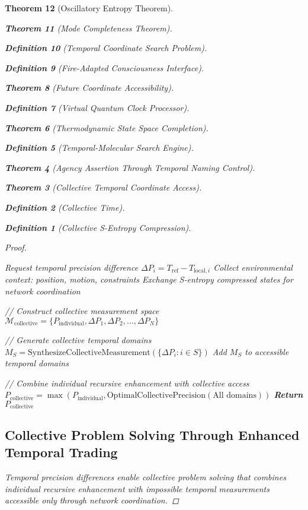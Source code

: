 \documentclass[12pt,a4paper]{article}
\newtheorem{theorem}{Theorem}[section]
\newtheorem{definition}[theorem]{Definition}
\begin{document}
\begin{theorem}[Oscillatory Entropy Theorem]
\begin{theorem}[Mode Completeness Theorem]
\begin{enumerate}
\begin{definition}[Temporal Coordinate Search Problem]
\begin{algorithm}
\begin{definition}[Fire-Adapted Consciousness Interface]
\begin{theorem}[Future Coordinate Accessibility]
\begin{definition}[Virtual Quantum Clock Processor]
\begin{itemize}
\begin{itemize}
\begin{theorem}[Thermodynamic State Space Completion]
\begin{definition}[Temporal-Molecular Search Engine]
\begin{theorem}[Agency Assertion Through Temporal Naming Control]
\begin{remark}
\begin{theorem}[Collective Temporal Coordinate Access]
\begin{definition}[Collective Time]
\begin{definition}[Collective S-Entropy Compression]
\begin{proof}
\begin{algorithm}
\begin{algorithmic}
    \State Request temporal precision difference $\Delta P_i = T_{\text{ref}} - T_{\text{local},i}$
    \State Collect environmental context: position, motion, constraints
    \State Exchange S-entropy compressed states for network coordination
\EndFor

\State // Construct collective measurement space
\State $\mathcal{M}_{\text{collective}} = \{P_{\text{individual}}, \Delta P_1, \Delta P_2, \ldots, \Delta P_N\}$

\State // Generate collective temporal domains
        \State $M_S = \text{SynthesizeCollectiveMeasurement}(\{\Delta P_i : i \in S\})$
        \State Add $M_S$ to accessible temporal domains
    \EndFor
\EndFor

\State // Combine individual recursive enhancement with collective access
\State $P_{\text{collective}} = \max(P_{\text{individual}}, \text{OptimalCollectivePrecision}(\text{All domains}))$
\State \textbf{Return} $P_{\text{collective}}$
\end{algorithmic}
\end{algorithm}

\subsection{Collective Problem Solving Through Enhanced Temporal Trading}

Temporal precision differences enable collective problem solving that combines individual recursive enhancement with impossible temporal measurements accessible only through network coordination.


\end{proof}
\end{definition}
\end{definition}
\end{theorem}
\end{remark}
\end{theorem}
\end{definition}
\end{theorem}
\end{itemize}
\end{itemize}
\end{definition}
\end{theorem}
\end{definition}
\end{algorithm}
\end{definition}
\end{enumerate}
\end{theorem}
\end{theorem}
\end{document}
